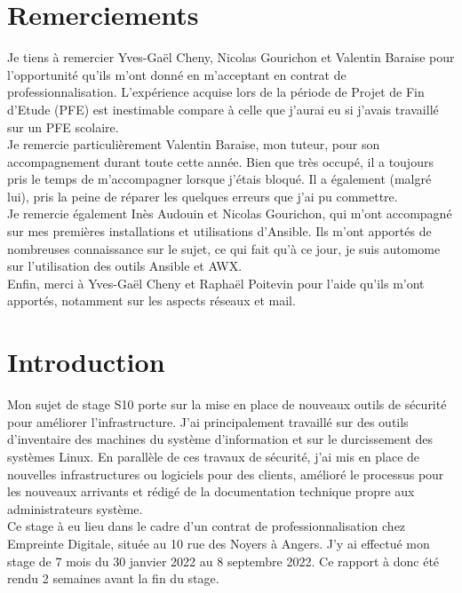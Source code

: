 \documentclass[12pt]{article}
\begin{document}
\newpage
\section{Remerciements}
Je tiens à remercier Yves-Gaël Cheny, Nicolas Gourichon et Valentin Baraise pour l'opportunité qu'ils m'ont donné en m'acceptant en contrat de professionnalisation. 
L'expérience acquise lors de la période de Projet de Fin d'Etude (PFE) est inestimable compare à celle que j'aurai eu si j'avais travaillé sur un PFE scolaire. \\

Je remercie particulièrement Valentin Baraise, mon tuteur, pour son accompagnement durant toute cette année. 
Bien que très occupé, il a toujours pris le temps de m'accompagner lorsque j'étais bloqué. 
Il a également (malgré lui), pris la peine de réparer les quelques erreurs que j'ai pu commettre. \\

Je remercie également Inès Audouin et Nicolas Gourichon, qui m'ont accompagné sur mes premières installations et utilisations d'Ansible. 
Ils m'ont apportés de nombreuses connaissance sur le sujet, ce qui fait qu'à ce jour, je suis automome sur l'utilisation des outils Ansible et AWX. \\

Enfin, merci à Yves-Gaël Cheny et Raphaël Poitevin pour l'aide qu'ils m'ont apportés, notamment sur les aspects réseaux et mail.


\newpage
\tableofcontents

\newpage
\section{Introduction}
Mon sujet de stage S10 porte sur la mise en place de nouveaux outils de sécurité pour améliorer l'infrastructure. 
J'ai principalement travaillé sur des outils d'inventaire des machines du système d'information et sur le durcissement des systèmes Linux. 
En parallèle de ces travaux de sécurité, j'ai mis en place de nouvelles infrastructures ou logiciels pour des clients, amélioré le processus pour les nouveaux arrivants et rédigé de la documentation technique propre aux administrateurs système. \\

Ce stage à eu lieu dans le cadre d'un contrat de professionnalisation chez Empreinte Digitale, située au 10 rue des Noyers à Angers. 
J'y ai effectué mon stage de 7 mois du 30 janvier 2022 au 8 septembre 2022. 
Ce rapport à donc été rendu 2 semaines avant la fin du stage. \\
\end{document}
